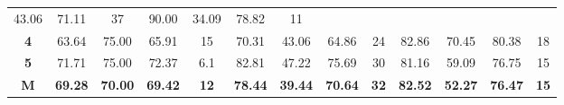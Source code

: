 \begin{table}[H]
\begin{tabular}{ccccccccccccc}
		\multicolumn{1}{c|}{43.06} &
		\multicolumn{1}{c|}{71.11} &
		\multicolumn{1}{c|}{37} &
		\multicolumn{1}{c|}{90.00} &
		\multicolumn{1}{c|}{34.09} &
		\multicolumn{1}{c|}{78.82} &
		\multicolumn{1}{c|}{11} \\ \cline{2-13} 
		\multicolumn{1}{c|}{\cellcolor[HTML]{C0C0C0}\textbf{4}} &
		\multicolumn{1}{c|}{63.64} &
		\multicolumn{1}{c|}{75.00} &
		\multicolumn{1}{c|}{65.91} &
		\multicolumn{1}{c|}{15} &
		\multicolumn{1}{c|}{70.31} &
		\multicolumn{1}{c|}{43.06} &
		\multicolumn{1}{c|}{64.86} &
		\multicolumn{1}{c|}{24} &
		\multicolumn{1}{c|}{82.86} &
		\multicolumn{1}{c|}{70.45} &
		\multicolumn{1}{c|}{80.38} &
		\multicolumn{1}{c|}{18} \\ \cline{2-13} 
		\multicolumn{1}{c|}{\cellcolor[HTML]{C0C0C0}\textbf{5}} &
		\multicolumn{1}{c|}{71.71} &
		\multicolumn{1}{c|}{75.00} &
		\multicolumn{1}{c|}{72.37} &
		\multicolumn{1}{c|}{6.1} &
		\multicolumn{1}{c|}{82.81} &
		\multicolumn{1}{c|}{47.22} &
		\multicolumn{1}{c|}{75.69} &
		\multicolumn{1}{c|}{30} &
		\multicolumn{1}{c|}{81.16} &
		\multicolumn{1}{c|}{59.09} &
		\multicolumn{1}{c|}{76.75} &
		\multicolumn{1}{c|}{15} \\ \cline{2-13} 
		\multicolumn{1}{c|}{\cellcolor[HTML]{FFFE65}\textbf{M}} &
		\multicolumn{1}{c|}{\textbf{69.28}} &
		\multicolumn{1}{c|}{\textbf{70.00}} &
		\multicolumn{1}{c|}{\textbf{69.42}} &
		\multicolumn{1}{c|}{\textbf{12}} &
		\multicolumn{1}{c|}{\textbf{78.44}} &
		\multicolumn{1}{c|}{\textbf{39.44}} &
		\multicolumn{1}{c|}{\textbf{70.64}} &
		\multicolumn{1}{c|}{\textbf{32}} &
		\multicolumn{1}{c|}{\textbf{82.52}} &
		\multicolumn{1}{c|}{\textbf{52.27}} &
		\multicolumn{1}{c|}{\textbf{76.47}} &
		\multicolumn{1}{c|}{\textbf{15}} \\ \cline{2-13} 
	\end{tabular}
\end{table}